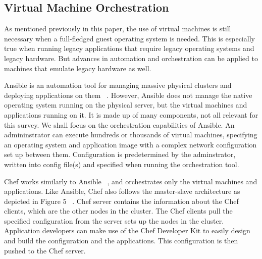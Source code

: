 \documentclass[10pt,twocolumn]{article}
\begin{document}
\subsection{Virtual Machine Orchestration}

As mentioned previously in this paper, the use of virtual machines is still necessary when a full-fledged guest operating system is needed.
This is especially true when running legacy applications that require legacy operating systems and legacy hardware.
But advances in automation and orchestration can be applied to machines that emulate legacy hardware as well.

Ansible is an automation tool for managing massive physical clusters and deploying applications on them ~\cite{ansible}.
However, Ansible does not manage the native operating system running on the physical server, but the virtual machines and applications running on it.
It is made up of many components, not all relevant for this survey.
We shall focus on the orchestration capabilities of Ansible.
An admininstrator can execute hundreds or thousands of virtual machines, specifying an operating system and application image with a complex network configuration set up between them.
Configuration is predetermined by the adminstrator, written into config file(s) and specified when running the orchestration tool.

Chef works similarly to Ansible ~\cite{chef}, and orchestrates only the virtual machines and applications.
Like Ansible, Chef also follows the master-slave architecture as depicted in Figure 5 ~\cite{chef_overiew}.
Chef server contains the information about the Chef clients, which are the other nodes in the cluster.
The Chef clients pull the specified configuration from the server sets up the nodes in the cluster.
Application developers can make use of the Chef Developer Kit to easily design and build the configuration and the applications.
This configuration is then pushed to the Chef server.
\end{document}
